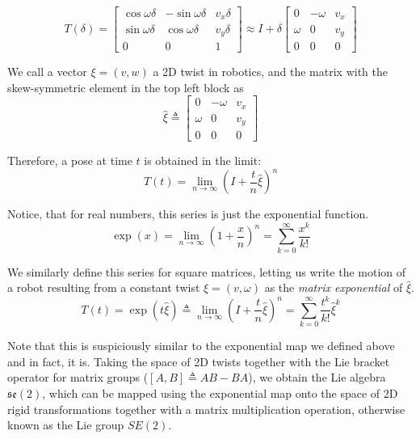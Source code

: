 \documentclass[reqno]{amsart}
\theoremstyle{definition}
\numberwithin{equation}{section}
\begin{document}
 \begin{equation*}
    T(\delta) = \begin{bmatrix}
        \cos\omega\delta & -\sin\omega\delta & v_x\delta \\
        \sin\omega\delta & \cos\omega\delta & v_y\delta \\
        0 & 0 & 1
    \end{bmatrix} \approx I + \delta\begin{bmatrix}
        0 & -\omega & v_x \\
        \omega & 0 & v_y \\
        0 & 0 & 0
    \end{bmatrix}
\end{equation*}

 We call a vector $\xi = (v, w)$ a 2D twist in robotics, and the matrix with the skew-symmetric element in the top left block as
 \begin{equation*}
    \hat\xi \triangleq \begin{bmatrix}
        0 & -\omega & v_x \\
        \omega & 0 & v_y \\
        0 & 0 & 0
    \end{bmatrix}
 \end{equation*}

 Therefore, a pose at time $t$ is obtained in the limit:
 \begin{equation*}
     T(t) = \lim_{n \to \infty}(I + \frac{t}{n}\hat\xi)^n  
 \end{equation*}

 Notice, that for real numbers, this series is just the exponential function.
 \begin{equation*}
     \exp(x) = \lim_{n \to \infty}(1 + \frac{x}{n})^n = \sum_{k = 0}^{\infty}\frac{x^k}{k!}
 \end{equation*}

 We similarly define this series for square matrices, letting us write the motion of a robot resulting from a constant twist $\xi = (v, \omega)$ as the \textit{matrix exponential} of $\hat\xi$.
 \begin{equation*}
     T(t) = \exp(t\hat\xi) \triangleq \lim_{n \to \infty}(I + \frac{t}{n}\hat\xi)^n = \sum_{k = 0}^{\infty} \frac{t^k}{k!}\hat\xi^k
 \end{equation*}

 Note that this is suspiciously similar to the exponential map we defined above and in fact, it is. Taking the space of 2D twists together with the Lie bracket operator for matrix groups ($[A, B] \triangleq AB - BA$), we obtain the Lie algebra $\mathfrak{se}(2)$, which can be mapped using the exponential map onto the space of 2D rigid transformations together with a matrix multiplication operation, otherwise known as the Lie group $SE(2)$.
\end{document}
